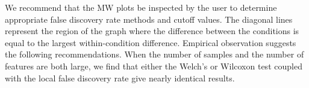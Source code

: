 \documentclass[11pt]{amsart}
\begin{document}

We recommend that the MW plots  be inspected by the user to determine appropriate false discovery rate methods and cutoff values. The diagonal lines represent the region of the graph where the difference between the conditions is equal to the largest within-condition difference\cite{fernandes:2013}. Empirical observation suggests the following recommendations. When the number of samples and the number of features are both large, we find that either the Welch's or Wilcoxon test coupled with the local false discovery rate give nearly identical results. 
\end{document}
